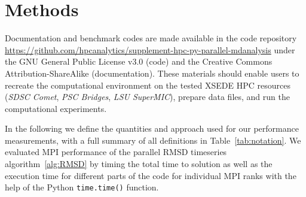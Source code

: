
\section{Methods}
\label{sec:methods}

Documentation and benchmark codes are made available in the code repository \url{https://github.com/hpcanalytics/supplement-hpc-py-parallel-mdanalysis} under the GNU General Public License v3.0 (code) and the Creative Commons Attribution-ShareAlike (documentation). 
These materials should enable users to recreate the computational environment on the tested XSEDE HPC resources (\emph{SDSC Comet}, \emph{PSC Bridges}, \emph{LSU SuperMIC}), prepare data files, and run the computational experiments.

In the following we define the quantities and approach used for our performance measurements, with a full summary of all definitions in Table~\ref{tab:notation}.
We evaluated MPI performance of the parallel RMSD timeseries algorithm~\ref{alg:RMSD} by timing the total time to solution as well as the execution time for different parts of the code for individual MPI ranks with the help of the Python \texttt{time.time()} function.


